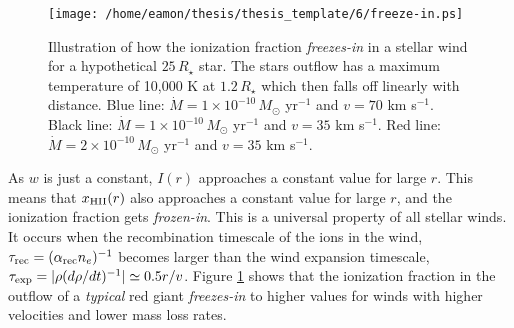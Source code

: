 \begin{figure}[hbt!]
\centering 
          \texttt{[image: /home/eamon/thesis/thesis\_template/6/freeze-in.ps]}
\caption[Illustration of how the ionization fraction \textit{freezes-in} in a stellar wind.]{Illustration of how the ionization fraction \textit{freezes-in} in a stellar wind for a hypothetical $25\,R_{\star}$ star. The stars outflow has a maximum temperature of 10,000 K at $1.2\,R_{\star}$ which then falls off linearly with distance. Blue line: $\dot{M} = 1 \times 10^{-10}\,M_{\odot}$ yr$^{-1}$ and $v=70$ km s$^{-1}$. Black line: $\dot{M} = 1 \times 10^{-10}\,M_{\odot}$ yr$^{-1}$ and $v=35$ km s$^{-1}$. Red line: $\dot{M} = 2 \times 10^{-10}\,M_{\odot}$ yr$^{-1}$ and $v=35$ km s$^{-1}$. }
\label{fig6.6.1}
\end{figure}

As $w$ is just a constant, $I(r)$ approaches a constant value for large $r$. This means that $x_{\rm{HII}}(r)$ also approaches a constant value for large $r$, and the ionization fraction gets \textit{frozen-in}. This is a universal property of all stellar winds. It occurs when the recombination timescale of the ions in the wind, $\tau _{\rm{rec}}=(\alpha _{\rm{rec}}n_e)^{-1}$ becomes larger than the wind expansion timescale, $\tau _{\rm{exp}}=|\rho (d\rho/dt)^{-1}|\simeq 0.5r/v$. Figure \ref{fig6.6.1} shows that the ionization fraction in the outflow of a \textit{typical} red giant \textit{freezes-in} to higher values for winds with higher velocities and lower mass loss rates. 

